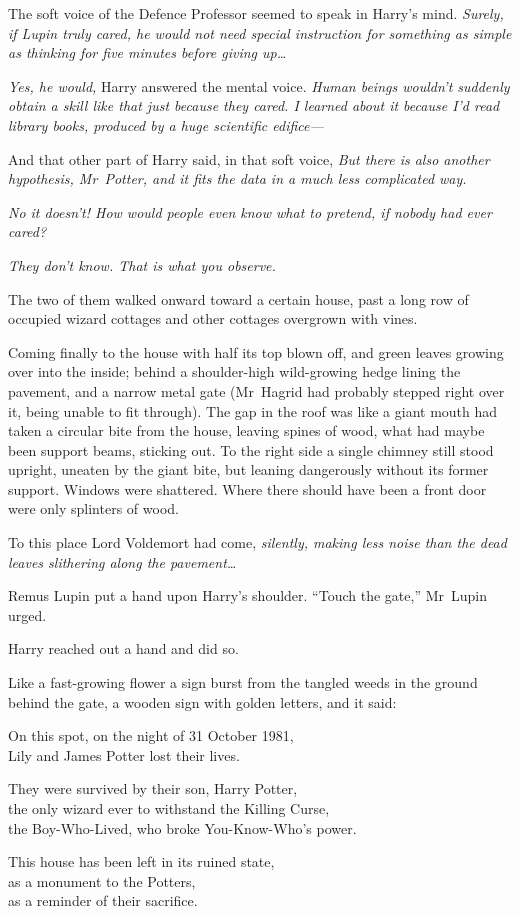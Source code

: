 The soft voice of the Defence Professor seemed to speak in Harry’s mind. \emph{Surely, if Lupin truly cared, he would not need special instruction for something as simple as thinking for five minutes before giving up…}

\emph{Yes, he would,} Harry answered the mental voice. \emph{Human beings wouldn’t suddenly obtain a skill like that just because they cared. I learned about it because I’d read library books, produced by a huge scientific edifice—}

And that other part of Harry said, in that soft voice, \emph{But there is also another hypothesis, Mr~Potter, and it fits the data in a much less complicated way.}

\emph{No it doesn’t! How would people even know what to pretend, if nobody had ever cared?}

\emph{They don’t know. That is what you observe.}

The two of them walked onward toward a certain house, past a long row of occupied wizard cottages and other cottages overgrown with vines.

Coming finally to the house with half its top blown off, and green leaves growing over into the inside; behind a shoulder-high wild-growing hedge lining the pavement, and a narrow metal gate (Mr~Hagrid had probably stepped right over it, being unable to fit through). The gap in the roof was like a giant mouth had taken a circular bite from the house, leaving spines of wood, what had maybe been support beams, sticking out. To the right side a single chimney still stood upright, uneaten by the giant bite, but leaning dangerously without its former support. Windows were shattered. Where there should have been a front door were only splinters of wood.

To this place Lord Voldemort had come, \emph{silently, making less noise than the dead leaves slithering along the pavement…}

Remus Lupin put a hand upon Harry’s shoulder. “Touch the gate,” Mr~Lupin urged.

Harry reached out a hand and did so.

Like a fast-growing flower a sign burst from the tangled weeds in the ground behind the gate, a wooden sign with golden letters, and it said:

\begin{center}
On this spot, on the night of 31 October 1981,\\
Lily and James Potter lost their lives.

They were survived by their son, Harry Potter,\\
the only wizard ever to withstand the Killing Curse,\\
the Boy-Who-Lived, who broke You-Know-Who’s power.

This house has been left in its ruined state,\\
as a monument to the Potters,\\
as a reminder of their sacrifice.
\end{center}

